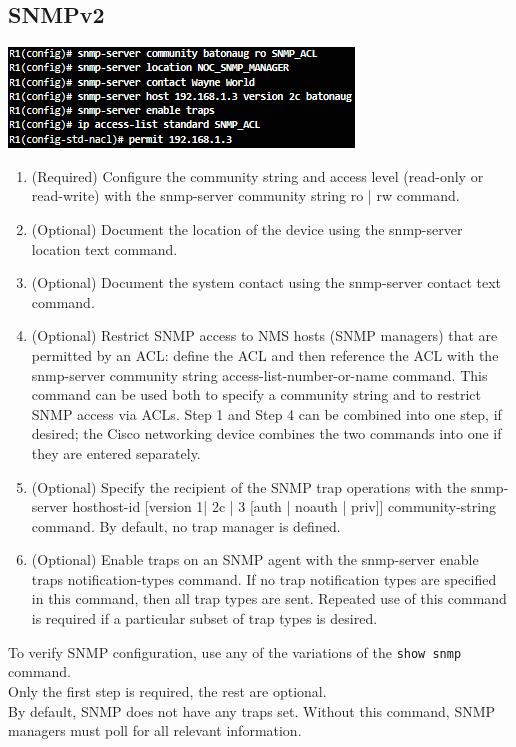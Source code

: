 \subsection{SNMPv2}
\begin{listing}
\includegraphics[scale=1]{pictures/SNMPv2.PNG} 
\end{listing}
\begin{enumerate}
\item (Required) Configure the community string and access level (read-only or read-write) with the snmp-server community string ro | rw command.

\item (Optional) Document the location of the device using the snmp-server location text command.

\item (Optional) Document the system contact using the snmp-server contact text command.

\item (Optional) Restrict SNMP access to NMS hosts (SNMP managers) that are permitted by an ACL: define the ACL and then reference the ACL with the snmp-server community string access-list-number-or-name command. This command can be used both to specify a community string and to restrict SNMP access via ACLs. Step 1 and Step 4 can be combined into one step, if desired; the Cisco networking device combines the two commands into one if they are entered separately.

\item (Optional) Specify the recipient of the SNMP trap operations with the snmp-server hosthost-id [version {1| 2c | 3 [auth | noauth | priv]}] community-string command. By default, no trap manager is defined.

\item (Optional) Enable traps on an SNMP agent with the snmp-server enable traps notification-types command. If no trap notification types are specified in this command, then all trap types are sent. Repeated use of this command is required if a particular subset of trap types is desired.
\end{enumerate}
\note To verify SNMP configuration, use any of the variations of the \texttt{show snmp} command.\\ \note Only the first step is required, the rest are optional.\\
\note By default, SNMP does not have any traps set. Without this command, SNMP managers must poll for all relevant information. 
